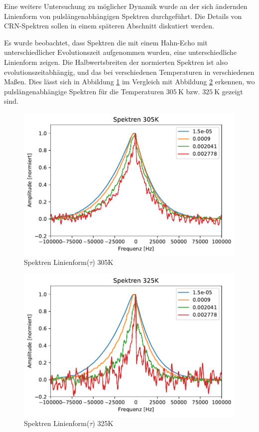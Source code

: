 Eine weitere Untersuchung zu möglicher Dynamik wurde an der sich ändernden Linienform von pulslängenabhängigen Spektren durchgeführt. Die Details von CRN-Spektren sollen in einem späteren Abschnitt diskutiert werden.

Es wurde beobachtet, dass Spektren die mit einem Hahn-Echo mit unterschiedlicher Evolutionszeit aufgenommen wurden, eine unterschiedliche Linienform zeigen. Die Halbwertsbreiten der normierten Spektren ist also evolutionszeitabhängig, und das bei verschiedenen Temperaturen in verschiedenen Maßen. Dies lässt sich in Abbildung \ref{fig:res:spekdyn_305K} im Vergleich mit Abbildung \ref{fig:res:spekdyn_325K} erkennen, wo pulslängenabhängige Spektren für die Temperaturen $\SI{305}{\kelvin}$ bzw. $\SI{325}{\kelvin}$ gezeigt sind.
\begin{figure}
	\begin{center}
		\includegraphics[width=\textwidth]{graphics/plots/SPEKDYN/spekdyn_305K.pdf}
	\end{center}
	\caption{Spektren Linienform($\tau$) 305K} \label{fig:res:spekdyn_305K}
\end{figure}
\begin{figure}
	\begin{center}
		\includegraphics[width=\textwidth]{graphics/plots/SPEKDYN/spekdyn_325K.pdf}
	\end{center}
	\caption{Spektren Linienform($\tau$) 325K} \label{fig:res:spekdyn_325K}
\end{figure}
